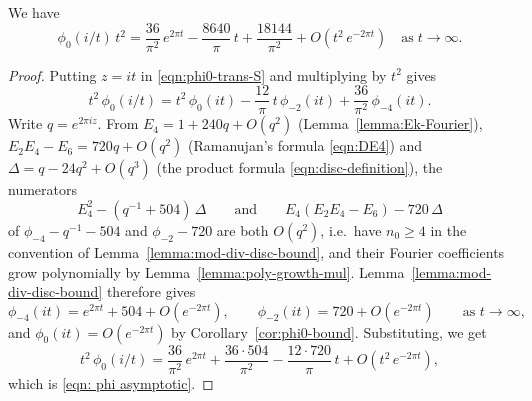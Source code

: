 \begin{lemma}\label{lemma:phi0-asymptotic}\leanok
We have
\begin{equation}\label{eqn: phi asymptotic}
\phi_0(i/t)\,t^2=\frac{36}{\pi^2}\,e^{2 \pi t}-\frac{8640}{\pi}\,t+\frac{18144}{\pi^2}+O(t^2\,e^{-2\pi t})\quad\mbox{as}\;t\to\infty.
\end{equation}
\end{lemma}
\begin{proof}\leanok
Putting $z = it$ in \eqref{eqn:phi0-trans-S} and multiplying by $t^2$ gives
\[
t^2\,\phi_0(i/t) = t^2\,\phi_0(it) - \frac{12}{\pi}\,t\,\phi_{-2}(it) + \frac{36}{\pi^2}\,\phi_{-4}(it).
\]
Write $q = e^{2\pi i z}$. From $E_4 = 1 + 240 q + O(q^2)$ (Lemma~\ref{lemma:Ek-Fourier}), $E_2 E_4 - E_6 = 720 q + O(q^2)$ (Ramanujan's formula \eqref{eqn:DE4}) and $\Delta = q - 24 q^2 + O(q^3)$ (the product formula \eqref{eqn:disc-definition}), the numerators
\[
E_4^2 - (q^{-1} + 504)\,\Delta \qquad\text{and}\qquad E_4(E_2E_4 - E_6) - 720\,\Delta
\]
of $\phi_{-4} - q^{-1} - 504$ and $\phi_{-2} - 720$ are both $O(q^2)$, i.e.\ have $n_0 \geq 4$ in the convention of Lemma~\ref{lemma:mod-div-disc-bound}, and their Fourier coefficients grow polynomially by Lemma~\ref{lemma:poly-growth-mul}. Lemma~\ref{lemma:mod-div-disc-bound} therefore gives
\[
\phi_{-4}(it) = e^{2\pi t} + 504 + O(e^{-2\pi t}), \qquad \phi_{-2}(it) = 720 + O(e^{-2\pi t}) \qquad\text{as } t \to \infty,
\]
and $\phi_0(it) = O(e^{-2\pi t})$ by Corollary~\ref{cor:phi0-bound}. Substituting, we get
\[
t^2\,\phi_0(i/t) = \frac{36}{\pi^2}\,e^{2\pi t} + \frac{36 \cdot 504}{\pi^2} - \frac{12 \cdot 720}{\pi}\,t + O(t^2\,e^{-2\pi t}),
\]
which is \eqref{eqn: phi asymptotic}.
\end{proof}

